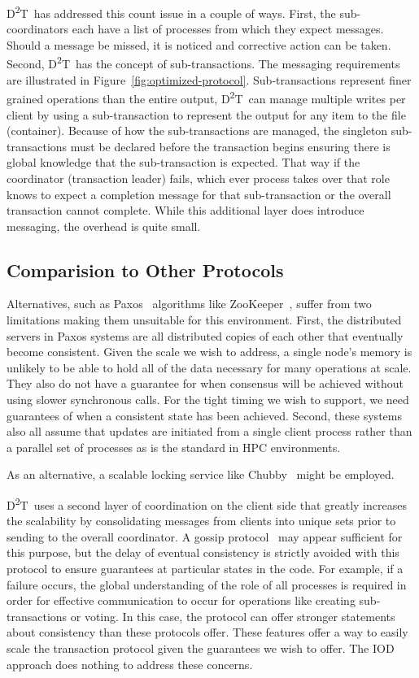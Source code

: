 \documentclass[conference]{sig-alt-gov2}
\newcommand{\DDT}{D\textsuperscript{2}T~}
\begin{document}
\DDT has addressed this count issue in a couple of ways. First, the
sub-coordinators each have a list of processes from which they expect messages.
Should a message be missed, it is noticed and corrective action can be taken.
Second, \DDT has the concept of sub-transactions. The messaging requirements
are illustrated in Figure~\ref{fig:optimized-protocol}.  Sub-transactions
represent finer grained operations than the entire output, \DDT can manage
multiple writes per client by using a sub-transaction to represent the output
for any item to the file (container). Because of how the sub-transactions are
managed, the singleton sub-transactions must be declared before the transaction
begins ensuring there is global knowledge that the sub-transaction is expected.
That way if the coordinator (transaction leader) fails, which ever process
takes over that role knows to expect a completion message for that
sub-transaction or the overall transaction cannot complete. While this
additional layer does introduce messaging, the overhead is quite small.

\subsection{Comparision to Other Protocols}
Alternatives, such as Paxos~\cite{Lamport:1998:paxos} algorithms like
ZooKeeper~\cite{Hunt:2010:zookeeper}, suffer from two limitations making them
unsuitable for this environment. First, the distributed servers in Paxos
systems are all distributed copies of each other that eventually become
consistent. Given the scale we wish to address, a single node's memory is
unlikely to be able to hold all of the data necessary for many operations at
scale. They also do not have a guarantee for when consensus will be achieved
without using slower synchronous calls. For the tight timing we wish to
support, we need guarantees of when a consistent state has been achieved.
Second, these systems also all assume that updates are initiated from a single
client process rather than a parallel set of processes as is the standard in
HPC environments.

As an alternative, a scalable locking service like Chubby~\cite{burrows:2006:chubby} might be employed.

\DDT uses a second layer of coordination on the client side that greatly
increases the scalability by consolidating messages from clients into unique
sets prior to sending to the overall coordinator. A gossip
protocol~\cite{ganesh:2003:gossip-protocols} may appear sufficient for this
purpose, but the delay of eventual consistency is strictly avoided with this
protocol to ensure guarantees at particular states in the code. For example, if
a failure occurs, the global understanding of the role of all processes is
required in order for effective communication to occur for operations like
creating sub-transactions or voting. In this case, the protocol can offer
stronger statements about consistency than these protocols offer.  These
features offer a way to easily scale the transaction protocol given the
guarantees we wish to offer. The IOD approach does nothing to address these
concerns.
\end{document}
